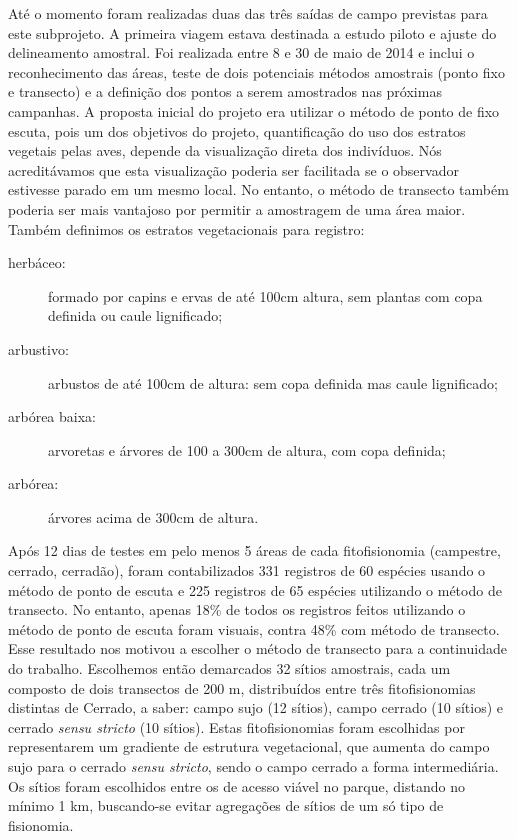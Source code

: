 \documentclass[12pt, A4]{article}
\begin{document}
Até o momento foram realizadas duas das três saídas de campo previstas
para este subprojeto. A primeira viagem estava destinada a estudo piloto
e ajuste do delineamento amostral. Foi realizada entre 8 e 30 de
maio de 2014 e inclui o reconhecimento das áreas, teste de dois
potenciais métodos amostrais (ponto fixo e transecto) e a definição dos pontos a serem
amostrados nas próximas campanhas. 
A proposta inicial do projeto era utilizar o método de ponto de
fixo escuta, pois um dos objetivos do projeto, quantificação do uso dos
estratos vegetais pelas aves, depende da visualização direta dos
indivíduos. Nós acreditávamos que esta visualização poderia ser
facilitada se o observador estivesse parado em um mesmo local. No
entanto, o método de transecto também poderia ser mais vantajoso por
permitir a amostragem de uma área maior. 
Também definimos os estratos vegetacionais para registro: 
\begin{description}
\item[herbáceo:] formado por capins e ervas de até 100cm altura, sem plantas com copa definida ou caule lignificado;
\item[arbustivo:] arbustos de até 100cm de altura: sem copa definida mas caule lignificado;
\item[arbórea baixa:] arvoretas e árvores de 100 a 300cm de altura, com copa definida;
\item[arbórea:] árvores acima de 300cm de altura. 
\end{description}

 Após 12 dias de testes em 
pelo menos 5 áreas de cada fitofisionomia (campestre, cerrado, cerradão),
foram contabilizados 331 registros de 60 espécies usando o método de
ponto de escuta e 225 registros de 65 espécies utilizando o método de
transecto. No entanto, apenas 18\% de todos os registros feitos
utilizando o método de ponto de escuta foram visuais, contra 48\%
com  método de transecto. Esse resultado nos motivou a escolher o método de
transecto para a continuidade do trabalho.
Escolhemos então demarcados 32 sítios amostrais,
cada um composto de dois transectos de 200 m, distribuídos entre três
fitofisionomias distintas de Cerrado, a saber: campo sujo (12 sítios), campo
cerrado (10 sítios) e cerrado \textit{sensu stricto} (10 sítios). 
Estas fitofisionomias foram
escolhidas por representarem um gradiente de estrutura vegetacional,
que aumenta do campo sujo para o cerrado \textit{sensu stricto}, sendo
o campo cerrado a forma intermediária. Os sítios foram escolhidos entre
os de acesso viável no parque, distando no mínimo 1 km, buscando-se
evitar agregações de sítios de um só tipo de fisionomia.
\end{document}
